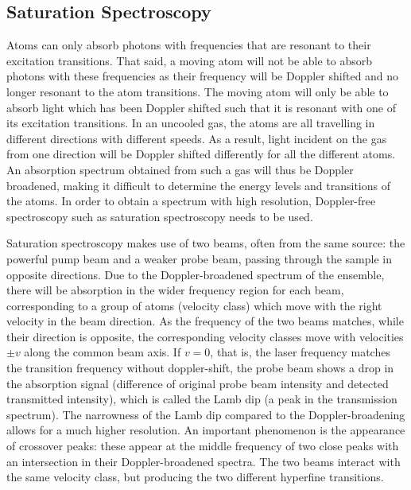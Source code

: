 \documentclass[twocolumn]{article}
\begin{document}
\subsection{Saturation Spectroscopy}
Atoms can only absorb photons with frequencies that are resonant to their excitation transitions. That said, a moving atom will not be able to absorb photons with these frequencies as their frequency will be Doppler shifted and no longer resonant to the atom transitions. The moving atom will only be able to absorb light which has been Doppler shifted such that it is resonant with one of its excitation transitions. In an uncooled gas, the atoms are all travelling in different directions with different speeds. As a result, light incident on the gas from one direction will be Doppler shifted differently for all the different atoms. An absorption spectrum obtained from such a gas will thus be Doppler broadened, making it difficult to determine the energy levels and transitions of the atoms. In order to obtain a spectrum with high resolution, Doppler-free spectroscopy such as saturation spectroscopy needs to be used. \\
\par Saturation spectroscopy makes use of two beams, often from the same source: the powerful pump beam and a weaker probe beam, passing through the sample in opposite directions. Due to the Doppler-broadened spectrum of the ensemble, there will be absorption in the wider frequency region for each beam, corresponding to a group of atoms (velocity class) which move with the right velocity in the beam direction.  As the frequency of the two beams matches, while their direction is opposite, the corresponding velocity classes move with velocities $\pm v$ along the common beam axis. If $v = 0$, that is, the laser frequency matches the transition frequency without doppler-shift, the probe beam shows a drop in the absorption signal (difference of original probe beam intensity and detected transmitted intensity), which is called the Lamb dip (a peak in the transmission spectrum). The narrowness of the Lamb dip compared to the Doppler-broadening allows for a much higher resolution.
An important phenomenon is the appearance of crossover peaks: these appear at the middle frequency of two close peaks with an intersection in their Doppler-broadened spectra. The two beams interact with the same velocity class, but producing the two different hyperfine transitions.
\end{document}

